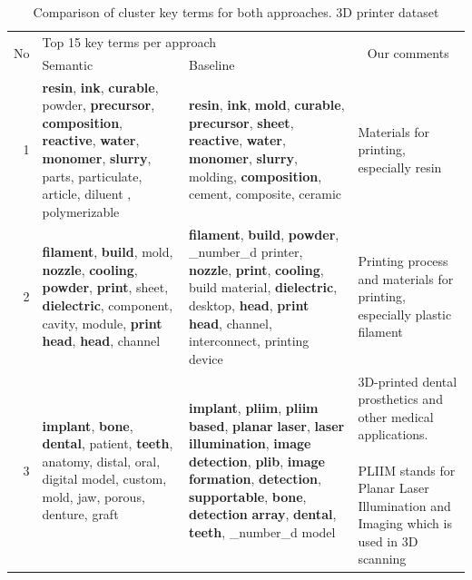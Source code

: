 \begin{table}[htbp]
  \centering
  \caption{Comparison of cluster key terms for both approaches. 3D printer dataset}
    \begin{tabular}{|r|p{12.39em}|l|l|}
    \toprule
    \multicolumn{1}{|c|}{\multirow{2}[4]{*}{No}} & \multicolumn{2}{p{23.61em}|}{Top 15 key terms per approach} & \multicolumn{1}{c|}{\multirow{2}[4]{10.335em}{Our comments}} \\
\cmidrule{2-3}      & Semantic & \multicolumn{1}{p{11.22em}|}{Baseline} &  \\
    \midrule
    1 & \textbf{resin}, \textbf{ink}, \textbf{curable}, powder, \textbf{precursor}, \textbf{composition}, \textbf{reactive}, \textbf{water}, \textbf{monomer}, \textbf{slurry}, parts, particulate, article, diluent , polymerizable & \multicolumn{1}{p{11.22em}|}{\textbf{resin}, \textbf{ink}, \textbf{mold}, \textbf{curable}, \textbf{precursor}, \textbf{sheet}, \textbf{reactive}, \textbf{water}, \textbf{monomer}, \textbf{slurry}, molding, \textbf{composition}, cement, composite, ceramic} & \multicolumn{1}{p{10.335em}|}{Materials for printing, especially resin} \\
    \midrule
    2 & \textbf{filament}, \textbf{build}, mold, \textbf{nozzle}, \textbf{cooling}, \textbf{powder}, \textbf{print}, sheet, \textbf{dielectric}, component, cavity, module, \textbf{print} \textbf{head}, \textbf{head}, channel & \multicolumn{1}{p{11.22em}|}{\textbf{filament}, \textbf{build}, \textbf{powder}, \_number\_d printer, \textbf{nozzle}, \textbf{print}, \textbf{cooling}, build material, \textbf{dielectric}, desktop, \textbf{head}, \textbf{print} \textbf{head}, channel, interconnect, printing device} & \multicolumn{1}{p{10.335em}|}{Printing process and materials for printing, especially plastic filament} \\
    \midrule
    3 & \textbf{implant}, \textbf{bone}, \textbf{dental}, patient, \textbf{teeth}, anatomy, distal, oral, digital model, custom, mold, jaw, porous, denture, graft & \multicolumn{1}{l|}{\multirow{2}[4]{11.22em}{\textbf{implant}, \textbf{pliim}, \textbf{pliim} \textbf{based}, \textbf{planar} \textbf{laser}, \textbf{laser} \textbf{illumination}, \textbf{image} \textbf{detection}, \textbf{plib}, \textbf{image} \textbf{formation}, \textbf{detection}, \textbf{supportable}, \textbf{bone}, \textbf{detection} \textbf{array}, \textbf{dental}, \textbf{teeth}, \_number\_d model}} & \multicolumn{1}{l|}{\multirow{2}[4]{10.335em}{3D-printed dental prosthetics and other medical applications. \newline{}\newline{}PLIIM stands for Planar Laser Illumination and Imaging which is used in 3D scanning}} \\

\end{tabular}
\end{table}

